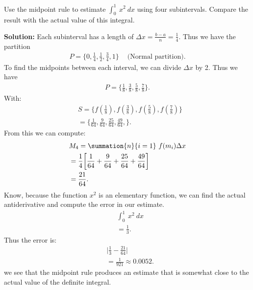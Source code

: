 \documentclass{report}
\begin{document}
     \pagebreak \bigbreak \noindent 
     \begin{eg}
         Use the midpoint rule to estimate  $\int_{0}^{1}\ x^{2}\ dx $ using four subintervals. Compare the result with the actual value of this integral.
     \end{eg}
      \bigbreak \noindent 
      \textbf{Solution:} Each subinterval has a length of $\Delta x = \frac{b-a}{n} = \frac{1}{4}$. Thus we have the partition 
         \begin{align*}
             P=\bigg\{0,\frac{1}{4},\frac{1}{2}, \frac{3}{4}, 1\bigg\}\ \quad \text{(Normal partition)}
         .\end{align*}
         \bigbreak \noindent 
         To find the midpoints between each interval, we can divide $\Delta x$ by 2. Thus we have 
         \begin{align*}
             P = \bigg\{\frac{1}{8}, \frac{3}{8},\frac{5}{8}, \frac{7}{8}\bigg\}
         .\end{align*}
         \bigbreak \noindent 
         With:
         \begin{align*}
             &S = \bigg\{f\left(\frac{1}{8}\right), f\left(\frac{3}{8}\right), f\left(\frac{5}{8}\right), f\left(\frac{7}{8}\right)\bigg\} \\
             &=\bigg\{\frac{1}{64}, \frac{9}{64}, \frac{25}{64}, \frac{49}{64}, \bigg\}
         .\end{align*}
         \bigbreak \noindent 
         From this we can compute:
         \begin{align*}
             &M_{4} = \summation{n}{i=1}\ f(m_{i})\Delta x \\
             &= \frac{1}{4}\bigg[\frac{1}{64}+\frac{9}{64}+\frac{25}{64} + \frac{49}{64}\bigg] \\
             &= \frac{21}{64}
         .\end{align*}
         \bigbreak \noindent 
         Know, because the function $x^{2}$ is an elementary function, we can find the actual antiderivative and compute the error in our estimate.
         \begin{align*}
             &\int_{0}^{1}\ x^{2}\ dx \\
             &=\frac{1}{3}
         .\end{align*}
         \bigbreak \noindent 
         Thus the error is: 
         \begin{align*}
             &\bigg|\frac{1}{3}-\frac{21}{64}\bigg| \\
             &=\frac{1}{921} \approx 0.0052
         .\end{align*}
         we see that the midpoint rule produces an estimate that is somewhat close to the actual value of the definite integral.
\end{document}

